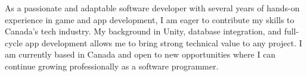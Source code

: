 {\normalsize\color{darktext}%
  As a passionate and adaptable software developer with several years of
  hands-on experience in game and app development, I am eager to contribute
  my skills to Canada's tech industry. My background in Unity, database
  integration, and full-cycle app development allows me to bring strong
  technical value to any project. I am currently based in Canada and open to
  new opportunities where I can continue growing professionally as a software
  programmer.%
}
\par\vspace{5pt}
